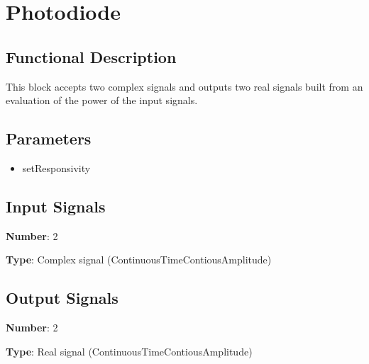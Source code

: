 \section{Photodiode}

\subsection*{Functional Description}

This block accepts two complex signals and outputs two real signals built from an evaluation of the power of the input signals.

\subsection*{Parameters}

\begin{multicols}{2}
	\begin{itemize}
		\item setResponsivity
	\end{itemize}
\end{multicols}

\subsection*{Input Signals}

\textbf{Number}: 2

\textbf{Type}: Complex signal (ContinuousTimeContiousAmplitude)

\subsection*{Output Signals}

\textbf{Number}: 2

\textbf{Type}: Real signal (ContinuousTimeContiousAmplitude)